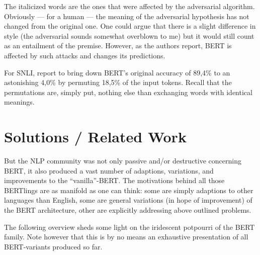 The italicized words are the ones that were affected by the adversarial algorithm.
Obviously --- for a human --- the meaning of the adversarial hypothesis has not
changed from the original one. One could argue that there is a slight difference
in style (the adversarial sounds somewhat overblown to me) but it would still count
as an entailment of the premise. However, as the authors report, BERT is affected
by such attacks and changes its predictions.

For SNLI, \citeauthor{jin2020bert} report to bring down BERT's original accuracy of
89,4\% to an astonishing 4,0\% by permuting 18,5\% of the input tokens. Recall that
the permutations are, simply put, nothing else than exchanging words with identical meanings.




\section{Solutions / Related Work}

But the NLP community was not only passive and/or destructive concerning BERT, it also
produced a vast number of adaptions, variations, and improvements to the ``vanilla''-BERT.
The motivations behind all those BERTlings are as manifold as one can think: some are simply
adaptions to other languages than English, some are general variations (in hope of improvement)
of the BERT architecture, other are explicitly addressing above outlined problems.

The following overview sheds some light on the iridescent potpourri of the BERT
family.
Note however that this is by no means an exhaustive presentation of all BERT-variants produced so far.


